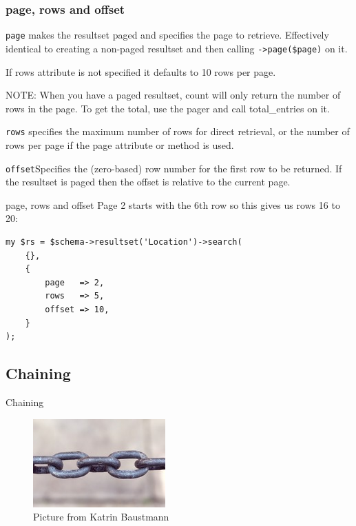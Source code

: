 \subsubsection{page, rows and offset}

\verb|page| makes the resultset paged and specifies the page to
retrieve. Effectively identical to creating a non-paged resultset and then
calling \verb|->page($page)| on it.

If rows attribute is not specified it defaults to 10 rows per page.

NOTE: When you have a paged resultset, count will only return the number of
rows in the page. To get the total, use the pager and call total\_entries on
it. 

\verb|rows| specifies the maximum number of rows for direct retrieval, or
the number of rows per page if the page attribute or method is used.

\verb|offset|Specifies the (zero-based) row number for the first row to be
returned. If the resultset is paged then the offset is relative to the
current page.

\begin{frame}[fragile]{page, rows and offset}
Page 2 starts with the 6th row so this gives us rows 16 to 20:

\begin{lstlisting}
my $rs = $schema->resultset('Location')->search(
    {},
    {
        page   => 2,
        rows   => 5,
        offset => 10,
    }
);
\end{lstlisting}
\end{frame}

\subsection{Chaining}

\begin{frame}{Chaining}
  \begin{figure}[!ht]
    \begin{center}
      \includegraphics{img/chains.jpg}
      \caption[Chains]{Picture from Katrin Baustmann}
    \end{center}
  \end{figure}
\end{frame}

